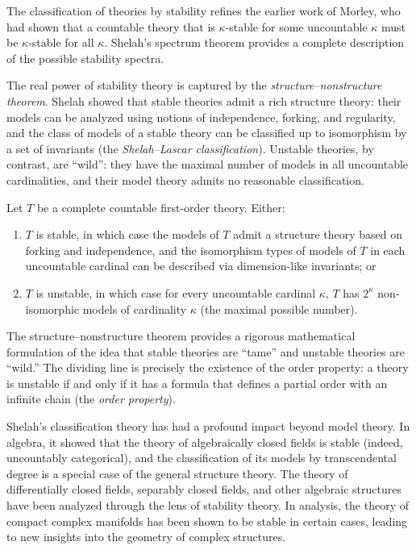 The classification of theories by stability refines the earlier work of Morley, who had shown that a countable theory that is \(\kappa\)-stable for some uncountable \(\kappa\) must be \(\kappa\)-stable for all \(\kappa\). Shelah's spectrum theorem provides a complete description of the possible stability spectra.

The real power of stability theory is captured by the \emph{structure--nonstructure theorem}. Shelah showed that stable theories admit a rich structure theory: their models can be analyzed using notions of independence, forking, and regularity, and the class of models of a stable theory can be classified up to isomorphism by a set of invariants (the \emph{Shelah--Lascar classification}). Unstable theories, by contrast, are ``wild'': they have the maximal number of models in all uncountable cardinalities, and their model theory admits no reasonable classification.

\begin{theorem}
Let \(T\) be a complete countable first-order theory. Either:
\begin{enumerate}
    \item \(T\) is stable, in which case the models of \(T\) admit a structure theory based on forking and independence, and the isomorphism types of models of \(T\) in each uncountable cardinal can be described via dimension-like invariants; or
    \item \(T\) is unstable, in which case for every uncountable cardinal \(\kappa\), \(T\) has \(2^{\kappa}\) non-isomorphic models of cardinality \(\kappa\) (the maximal possible number).
\end{enumerate}
\end{theorem}

The structure--nonstructure theorem provides a rigorous mathematical formulation of the idea that stable theories are ``tame'' and unstable theories are ``wild.'' The dividing line is precisely the existence of the order property: a theory is unstable if and only if it has a formula that defines a partial order with an infinite chain (the \emph{order property}).

Shelah's classification theory has had a profound impact beyond model theory. In algebra, it showed that the theory of algebraically closed fields is stable (indeed, uncountably categorical), and the classification of its models by transcendental degree is a special case of the general structure theory. The theory of differentially closed fields, separably closed fields, and other algebraic structures have been analyzed through the lens of stability theory. In analysis, the theory of compact complex manifolds has been shown to be stable in certain cases, leading to new insights into the geometry of complex structures.

